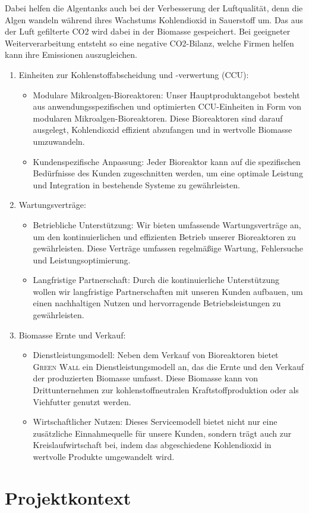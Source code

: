     Dabei helfen die Algentanks auch bei der Verbesserung der Luftqualität, denn die Algen wandeln während ihres Wachstums Kohlendioxid in Sauerstoff um.
    Das aus der Luft gefilterte CO2 wird dabei in der Biomasse gespeichert.
    Bei geeigneter Weiterverarbeitung entsteht so eine negative CO2-Bilanz, welche Firmen helfen kann ihre Emissionen auszugleichen.


\begin{enumerate}
    \item Einheiten zur Kohlenstoffabscheidung und -verwertung (CCU):
    \begin{itemize}
        \item Modulare Mikroalgen-Bioreaktoren: Unser Hauptproduktangebot besteht aus anwendungsspezifischen und optimierten CCU-Einheiten in Form von modularen Mikroalgen-Bioreaktoren.
        Diese Bioreaktoren sind darauf ausgelegt, Kohlendioxid effizient abzufangen und in wertvolle Biomasse umzuwandeln.
        \item Kundenspezifische Anpassung: Jeder Bioreaktor kann auf die spezifischen Bedürfnisse des Kunden zugeschnitten werden, um eine optimale Leistung und Integration in bestehende Systeme zu gewährleisten.
    \end{itemize}
    \item Wartungsverträge:
    \begin{itemize}
        \item Betriebliche Unterstützung: Wir bieten umfassende Wartungsverträge an, um den kontinuierlichen und effizienten Betrieb unserer Bioreaktoren zu gewährleisten.
        Diese Verträge umfassen regelmäßige Wartung, Fehlersuche und Leistungsoptimierung.
        \item Langfristige Partnerschaft: Durch die kontinuierliche Unterstützung wollen wir langfristige Partnerschaften mit unseren Kunden aufbauen, um einen nachhaltigen Nutzen und hervorragende Betriebsleistungen zu gewährleisten.
    \end{itemize}
    \item Biomasse Ernte und Verkauf:
    \begin{itemize}
        \item Dienstleistungsmodell: Neben dem Verkauf von Bioreaktoren bietet \textsc{Green Wall} ein Dienstleistungsmodell an, das die Ernte und den Verkauf der produzierten Biomasse umfasst.
        Diese Biomasse kann von Drittunternehmen zur kohlenstoffneutralen Kraftstoffproduktion oder als Viehfutter genutzt werden.
        \item Wirtschaftlicher Nutzen: Dieses Servicemodell bietet nicht nur eine zusätzliche Einnahmequelle für unsere Kunden, sondern trägt auch zur Kreislaufwirtschaft bei, indem das abgeschiedene Kohlendioxid in wertvolle Produkte umgewandelt wird.
    \end{itemize}
\end{enumerate}

\section{Projektkontext}